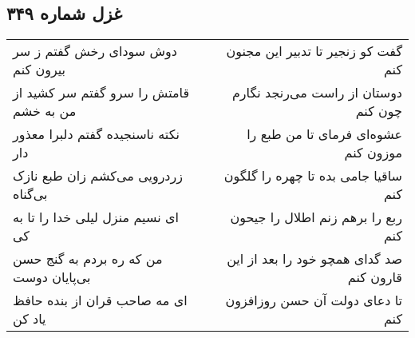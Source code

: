 \begin{center}
\section*{غزل شماره ۳۴۹}
\label{sec:sh349}
\begin{longtable}{l p{0.5cm} r}
دوش سودای رخش گفتم ز سر بیرون کنم
&&
گفت کو زنجیر تا تدبیر این مجنون کنم
\\
قامتش را سرو گفتم سر کشید از من به خشم
&&
دوستان از راست می‌رنجد نگارم چون کنم
\\
نکته ناسنجیده گفتم دلبرا معذور دار
&&
عشوه‌ای فرمای تا من طبع را موزون کنم
\\
زردرویی می‌کشم زان طبع نازک بی‌گناه
&&
ساقیا جامی بده تا چهره را گلگون کنم
\\
ای نسیم منزل لیلی خدا را تا به کی
&&
ربع را برهم زنم اطلال را جیحون کنم
\\
من که ره بردم به گنج حسن بی‌پایان دوست
&&
صد گدای همچو خود را بعد از این قارون کنم
\\
ای مه صاحب قران از بنده حافظ یاد کن
&&
تا دعای دولت آن حسن روزافزون کنم
\\
\end{longtable}
\end{center}
